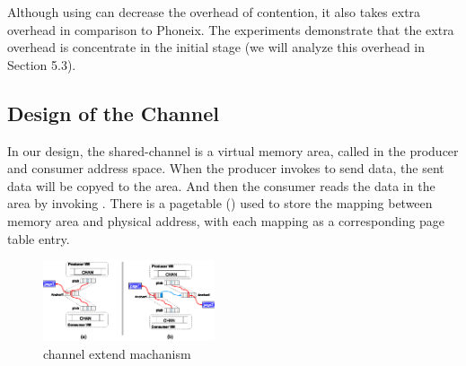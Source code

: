 Although using \myth can decrease the overhead of contention,
it also takes extra overhead in comparison to Phoneix. The experiments demonstrate that the extra overhead 
is concentrate in the initial stage (we will analyze this overhead in Section 5.3). 


\subsection{Design of the Channel}
In our design, the shared-channel is a virtual memory area, called  in the producer and consumer address space.
When the producer invokes  to send data, the sent data will be copyed to the  area.
And then the consumer reads the data in the  area  by invoking .
There is a pagetable () used to store the mapping between  memory area and physical address, with each mapping as a corresponding page table entry.



\begin{figure}[!h!t]  
	\centering
	\includegraphics[width=0.45\textwidth]{eps/chan_extend.eps}
	\caption{channel extend machanism}
	\label{fig:spmckern:extend}
\end{figure}

